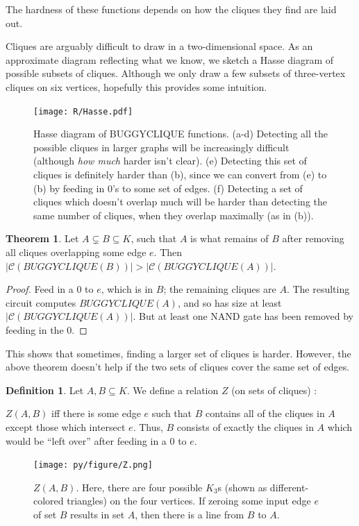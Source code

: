 \documentclass[12pt]{article}
\theoremstyle{definition}
\newtheorem{thm}{Theorem}[section]
\newtheorem{defn}{Definition}[section]
\newcommand{\bigC}[0]{\mathcal{C}}
\begin{document}
The hardness of these functions depends
on how the cliques they find are laid out.

Cliques are arguably difficult to draw in a two-dimensional space.
As an approximate diagram reflecting what we know,
we sketch a Hasse diagram of possible subsets of cliques. Although
we only draw a few subsets of three-vertex cliques
on six vertices, hopefully this provides some
intuition.

\begin{figure}
\centering
\texttt{[image: R/Hasse.pdf]}
\caption{Hasse diagram of BUGGYCLIQUE functions.
(a-d) 
Detecting all the possible cliques in larger graphs will be
increasingly difficult (although {\em how much} harder isn't clear).
(e) 
Detecting this set of cliques is definitely harder than (b),
since we can convert from (e) to (b) by feeding in 0's to
some set of edges.
(f) Detecting a set of cliques which doesn't overlap much will be
harder than detecting the same number of cliques, when they overlap
maximally (as in (b)).}
\label{fig:Hasse}
\end{figure}

\begin{thm}
\label{edgeZonking}
Let $A \subsetneq B \subseteq K$, such that $A$ is what remains
of $B$ after removing all cliques overlapping some edge $e$.
Then $|\bigC(BUGGYCLIQUE(B))| > |\bigC(BUGGYCLIQUE(A))|$.
\end{thm}
\begin{proof}
Feed in a 0 to $e$, which is in $B$; the remaining cliques are $A$.
The resulting
circuit computes $BUGGYCLIQUE(A)$, and so has size
at least $|\bigC(BUGGYCLIQUE(A))|$. But at least one
NAND gate has been removed by feeding in the 0.
\end{proof}

This shows that sometimes, finding a larger set of cliques is
harder. However, the above theorem doesn't help if the two
sets of cliques cover the same set of edges.

\begin{defn}
\label{zRelation}
Let $A, B \subseteq K$. We define a relation $Z$ (on sets of cliques) :

$Z(A,B)$ iff there is some edge $e$ such that $B$ contains all of the
cliques in $A$ except those which intersect $e$. Thus, $B$ consists
of exactly the cliques in $A$ which would be ``left over'' after
feeding in a 0 to $e$.
\end{defn}

\begin{figure}
\centering
\texttt{[image: py/figure/Z.png]}
\caption{$Z(A,B).$ Here, there are four possible $K_3$s
(shown as different-colored triangles) on the four vertices.
If zeroing some input edge $e$ of set $B$ results in set $A$, then
there is a line from $B$ to $A$.
}

\label{fig:Z}
\end{figure}
\end{document}
